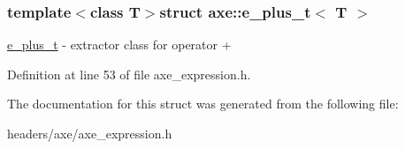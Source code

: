\subsubsection*{template$<$class T$>$struct axe\+::e\+\_\+plus\+\_\+t$<$ T $>$}

\hyperlink{structaxe_1_1e__plus__t}{e\+\_\+plus\+\_\+t} -\/ extractor class for operator + 

Definition at line 53 of file axe\+\_\+expression.\+h.



The documentation for this struct was generated from the following file\+:\begin{DoxyCompactItemize}
\item 
headers/axe/axe\+\_\+expression.\+h\end{DoxyCompactItemize}
